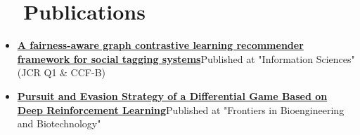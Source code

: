 \documentclass[a4paper,20pt]{article}
\newcommand{\resumeItem}[2]{
  \item\small{
    \textbf{#1}{#2 \vspace{-2pt}}
  }
}
\newcommand{\resumeSubItem}[2]{\resumeItem{#1}{#2}\vspace{-3pt}}
\newcommand{\resumeSubHeadingListStart}{\begin{itemize}[leftmargin=*]}
\newcommand{\resumeSubHeadingListEnd}{\end{itemize}}
\begin{document}
\section{~~Publications}
\resumeSubHeadingListStart
\resumeSubItem{\href{https://www.sciencedirect.com/science/article/pii/S0020025523006497}{A fairness-aware graph contrastive learning recommender framework for social tagging systems}}{Published at "Information Sciences" (JCR Q1 \& CCF-B)}
\vspace{2pt}
\resumeSubItem{\href{https://www.frontiersin.org/articles/10.3389/fbioe.2022.827408/full}{Pursuit and Evasion Strategy of a Differential Game Based on Deep Reinforcement Learning}}{Published at "Frontiers in Bioengineering and Biotechnology"}
\resumeSubHeadingListEnd
\vspace{-5pt}

\end{document}
